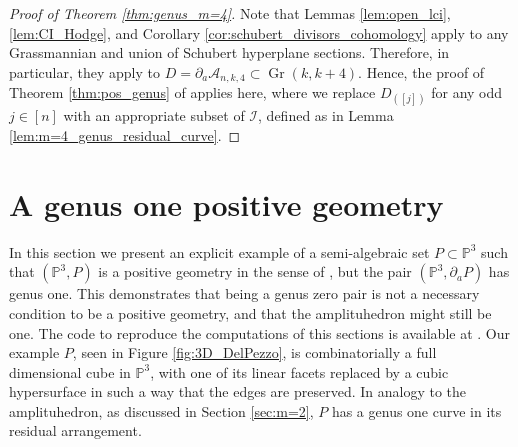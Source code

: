 \documentclass[12pt]{extarticle}
\theoremstyle{definition}
\theoremstyle{theorem}
\theoremstyle{remark}
\numberwithin{equation}{section}
\newcommand{\PP}{\mathbb{P}}
\DeclareMathOperator{\gr}{Gr}
\newcommand{\aA}{\mathcal{A}}
\newcommand{\odd}[1]{([#1])}
\begin{document}
\begin{proof}[Proof of Theorem \ref{thm:genus_m=4}]
    Note that Lemmas \ref{lem:open_lci}, \ref{lem:CI_Hodge}, and Corollary \ref{cor:schubert_divisors_cohomology} apply to any Grassmannian and union of Schubert hyperplane sections.
    Therefore, in particular, they apply to $D=\partial_a\aA_{n,k,4}\subset\gr(k,k+4)$.
    Hence, the proof of Theorem \ref{thm:pos_genus} of applies here, where we replace $D_{\odd{j}}$ for any odd $j\in [n]$ with an appropriate subset of $\mathcal{I}$, defined as in Lemma \ref{lem:m=4_genus_residual_curve}.
\end{proof}

\section{A genus one positive geometry}
\label{sec:genus_one_PG}

In this section we present an explicit example of a semi-algebraic set $P \subset \mathbb{P}^3$ such that $(\mathbb{P}^3, P)$ is a positive geometry in the sense of \cite{pos_geom_2017}, but the pair $(\mathbb{P}^3, \partial_a P)$ has genus one. This demonstrates that being a genus zero pair is not a necessary condition to be a positive geometry, and that the amplituhedron might still be one. The code to reproduce the computations of this sections is available at \cite{zenodo}.
Our example $P$, seen in Figure \ref{fig:3D_DelPezzo}, is combinatorially a full dimensional cube in $\PP^3$, with one of its linear facets replaced by a cubic hypersurface in such a way that the edges are preserved.
In analogy to the amplituhedron, as discussed in Section \ref{sec:m=2}, $P$ has a genus one curve in its residual arrangement.
\end{document}
